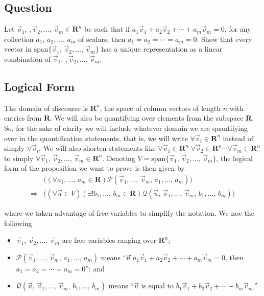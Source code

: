 \documentclass[a4paper,11pt]{article}
\newcommand{\R}{\mathbf{R}}
\newcommand{\PP}{\mathscr{P}}
\newcommand{\QQ}{\mathscr{Q}}
\begin{document}
\subsection*{Question}

Let $\vec v_1,\,,\vec v_2,\dots,\,\vec v_m \in \R^n$ be such that if $a_1\vec
v_1 + a_2\vec v_2 + \cdots + a_m\vec v_m=0$, for any collection
$a_1,\,a_2,\dots,\,a_m$ of scalars, then $a_1=a_2=\cdots=a_m=0$. Show that every
vector in $\text{span}\{\vec v_1,\,\vec v_2,\dots,\,\vec v_m\}$ has a unique
representation as a linear combination of $\vec v_1,\,,\vec v_2,\dots,\,\vec v_m$.

\subsection*{Logical Form}

The domain of discourse is $\R^n$, the space of column vectors of length $n$
with entries from $\R$. We will also be quantifying over elements from the
subspace $\R$. So, for the sake of clarity we will include whatever domain we
are quantifying over in the quantification statements, that is, we will write
$\forall \vec v_i \in \R^n$ instead of simply $\forall \vec v_i$. We will also
shorten statements like $\forall\vec v_1 \in \R^n\;\forall\vec v_2 \in \R^n
\cdots \forall\vec v_m \in \R^n$ to simply $\forall\vec v_1,\,\vec
v_2,\dots,\,\vec v_m \in \R^n$. Denoting $V=\text{span}\{\vec v_1,\,\vec
v_2,\dots,\,\vec v_m\}$, the logical form of the proposition we want to prove is
then given by
\begin{align*}
  &\Big(
  (\forall a_1,\dots,\,a_m \in \R)\PP(\vec v_1,\dots,\,\vec v_m,\,a_1,\dots,\,a_m)
  \Big) \\
  \Rightarrow&
  \Big(
  (\forall\vec u \in V)(\exists!b_1,\dots,\,b_m \in \R)\QQ(\vec
  u,\,\vec v_1,\dots,\,\vec v_m,\,b_1,\dots,\,b_m)
  \Big)
\end{align*}

\noindent where we taken advantage of free variables to simplify the notation.
We noe the following
\begin{itemize}
\item $\vec v_1,\,\vec v_2,\dots,\,\vec v_m$ are free variables ranging over
  $\R^n$;
\item $\PP(\vec v_1,\dots,\,\vec v_m,\,a_1,\dots,\,a_m)$ means ``if $a_1\vec v_1
  + a_2\vec v_2 + \cdots + a_m\vec v_m =0$, then $a_1=a_2=\cdots=a_m=0$''; and
\item $\QQ(\vec u,\,\vec v_1,\dots,\,\vec v_m,\,b_1,\dots,\,b_m)$ means ``$\vec
  u$ is equal to $b_1\vec v_1 + b_2\vec v_2 + \cdots + b_m\vec v_m$.''
\end{itemize}
\end{document}
